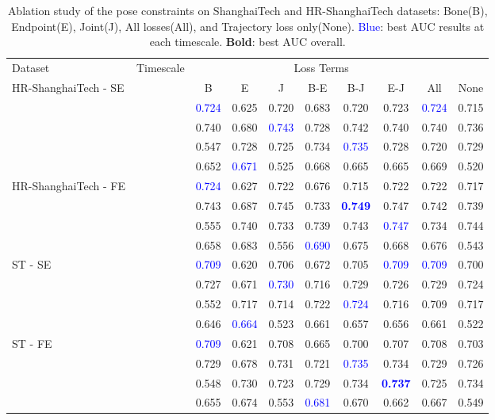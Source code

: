 \documentclass[nohyperref]{article}
\theoremstyle{plain}
\theoremstyle{definition}
\theoremstyle{remark}
\begin{document}
\begin{table*}[h!]
\caption{Ablation study of the pose constraints on ShanghaiTech and HR-ShanghaiTech datasets: Bone(B), Endpoint(E), Joint(J), All losses(All), and Trajectory loss only(None). \textcolor{blue}{Blue}: best AUC results at each timescale. \textbf{Bold}: best AUC overall.}
\label{table:ablation_st} 
\centering
\begin{tabular}{p{2cm}|c|cccccccc} 
 \hline
  \multirow{1}{*}{Dataset}& \multirow{1}{*}{Timescale}& \multicolumn{7}{c}{Loss Terms} \\\cline{3-10}
  \multirow{4}{1.3cm}{ \hspace{15mm} HR-ShanghaiTech - SE} &    & B & E &J & B-E& B-J& E-J& All & None\\ \hline
  &   & \textcolor{blue}{0.724}	&	0.625	&	0.720	&	0.683	&	0.720	&	0.723	&	\textcolor{blue}{0.724}  &0.715\\
  &  & 0.740	&	0.680	&	\textcolor{blue}{0.743}	&	0.728	&	0.742	&	0.740	&	0.740	&0.736	\\
  &  & 0.547	&	0.728	&	0.725	&	0.734	&\textcolor{blue}{0.735}	&	0.728	&	0.720 & 0.729\\
  &  & 0.652	&	\textcolor{blue}{0.671}	&	0.525	&	0.668	&	0.665	&	0.665	&	0.669 & 0.520\\\hline
\multirow{4}{1.3cm}{ \hspace{15mm} HR-ShanghaiTech - FE} &  & \textcolor{blue}{0.724}	&	0.627	&	0.722	&	0.676	&	0.715	&	0.722	&	0.722 &0.717 \\	
  &  & 0.743	&	0.687	&	0.745	&	0.733	&	\textbf{\textcolor{blue}{0.749}}	&	0.747	&	0.742 & 0.739\\
  &  & 0.555	&	0.740	&	0.733	&	0.739	&	0.743	&	\textcolor{blue}{0.747}	&	0.734 &0.744\\
  &  & 0.658	&	0.683	&	0.556	&	\textcolor{blue}{0.690}	&	0.675	&	0.668	&	0.676	& 0.543\\	\hline
\multirow{4}{1.3cm}{ \hspace{15mm} ST - SE} & & \textcolor{blue}{0.709}	&	0.620	&	0.706	&	0.672	&	0.705	&	\textcolor{blue}{0.709}	&	\textcolor{blue}{0.709}	& 0.700\\
  &  &  0.727	&	0.671	&	\textcolor{blue}{0.730}	&	0.716	&	0.729	&	0.726	&	0.729 & 0.724\\
  &  & 0.552	&	0.717	&	0.714	&	0.722	&	\textcolor{blue}{0.724}	&	0.716	&	0.709& 0.717 \\
  &  &  0.646	&	\textcolor{blue}{0.664}	&	0.523	&	0.661	&	0.657	&	0.656	&	0.661	&	0.522\\\hline \multirow{4}{1.1cm}{ \hspace{15mm} ST - FE}&  & \textcolor{blue}{0.709}	&	0.621	&	0.708	&	0.665	&	0.700	&	0.707	&	0.708 & 0.703 \\
  &  & 0.729	&	0.678	&	0.731	&	0.721	&	\textcolor{blue}{0.735}	&	0.734	&	0.729 &0.726\\
  &  & 0.548	&	0.730	&	0.723	&	0.729	&	0.734	&	\textbf{\textcolor{blue}{0.737}}	&	0.725& 	0.734\\
  &  & 0.655	&	0.674	&	0.553	&	\textcolor{blue}{0.681}	&	0.670	&	0.662	&	0.667	& 0.549\\ \hline
  \end{tabular}\end{table*}
\end{document}

